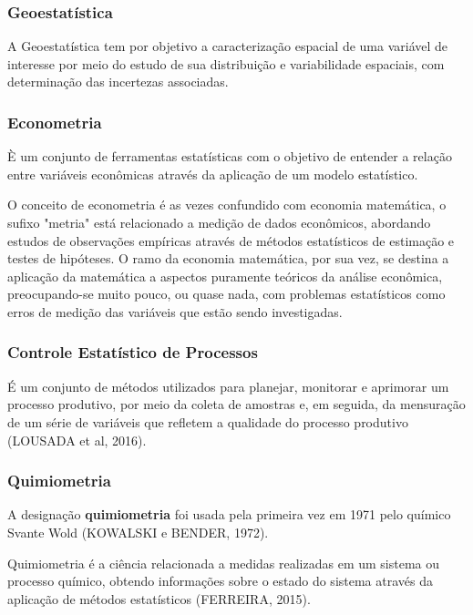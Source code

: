 \subsubsection{Geoestatística} 

A Geoestatística tem por objetivo a caracterização espacial de uma variável de interesse por meio do
estudo de sua distribuição e variabilidade espaciais, com determinação das incertezas associadas.\vskip0.3cm

\subsubsection{Econometria} 

È um conjunto de ferramentas estatísticas com o objetivo de entender a relação entre variáveis econômicas através da aplicação de um modelo estatístico.\vskip0.3cm

O conceito de econometria é as vezes confundido com economia matemática, o sufixo "metria" está relacionado a medição de dados econômicos, abordando estudos de observações empíricas através de métodos estatísticos de estimação e testes de hipóteses. O ramo da economia matemática, por sua vez, se destina a aplicação da matemática a aspectos puramente teóricos da análise econômica, preocupando-se muito pouco, ou quase nada, com problemas estatísticos como erros de medição das variáveis que estão sendo investigadas.\vskip0.3cm

\subsubsection{Controle Estatístico de Processos} 

É um conjunto de métodos utilizados para planejar, monitorar e aprimorar um processo produtivo, por meio da coleta de amostras e, em seguida, da mensuração de um série de variáveis que refletem a qualidade do processo produtivo (LOUSADA et al, 2016).\vskip0.3cm

\subsubsection{Quimiometria} 

A designação \textbf{quimiometria} foi usada pela primeira vez em 1971 pelo químico Svante Wold (KOWALSKI e BENDER, 1972).
\vskip0.3cm

Quimiometria é a ciência relacionada a medidas realizadas em um sistema ou processo químico, obtendo informações sobre o estado do sistema através da aplicação de métodos estatísticos (FERREIRA, 2015).\vskip0.3cm

